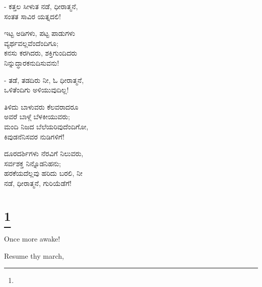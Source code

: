 \begin{flushright}
- ಕತ್ತಲ ಸೀಳುತ ನಡೆ, ಧೀರಾತ್ಮನೆ,\\ಸಂತತ ಸಾವಿರ ಯತ್ನದಲಿ!
\end{flushright}

\begin{myquote}
ಇಟ್ಟ ಅಡಿಗಳು, ಪಟ್ಟ ಪಾಡುಗಳು\\ವ್ಯರ್ಥವಲ್ಲವೆಂದೆಂದಿಗೂ;\\ಕನಸು ಕರಗಿದರು, ಶಕ್ತಿಗುಂದಿದರು\\ನಿನ್ನುದ್ಧಾರಕನುದಿಸುವನು!
\end{myquote}

\begin{flushright}
- ತಡೆ, ತಡದಿರು ನೀ, ಓ ಧೀರಾತ್ಮನೆ,\\ಒಳಿತೆಂದಿಗು ಅಳಿಯುವುದಿಲ್ಲ!
\end{flushright}

\begin{myquote}
ತಿಳಿದು ಬಾಳುವರು ಕೆಲವರಾದರೂ\\ಅವರೆ ಬಾಳ್ಗೆ ಬೆಳಕೀಯುವರು;\\ಮಂದಿ ನಿಜದ ಬೆಲೆಯರಿವುದೆಂದಿಗೋ,\\ಕಿವುಡನೆನಿಸವರ ನುಡಿಗಳಿಗೆ!
\end{myquote}

\begin{myquote}
ದೂರದರ್ಶಿಗಳು ನೆರವಿಗೆ ನಿಲುವರು,\\ಸರ್ವಶಕ್ತ ನಿನ್ನೊಡನಿಹನು;\\ಹರಕೆಯದೆಲ್ಲವು ಹರಿದು ಬರಲಿ, ನೀ\\ನಡೆ, ಧೀರಾತ್ಮನೆ, ಗುರಿಯೆಡೆಗೆ!
\end{myquote}

\selecteng

\chapter[TO THE AWAKENED INDIA]{\protect\footnote{}}

Once more awake!

\begin{myquote}
\end{myquote}

Resume thy march,

\begin{myquote}
\end{myquote}

